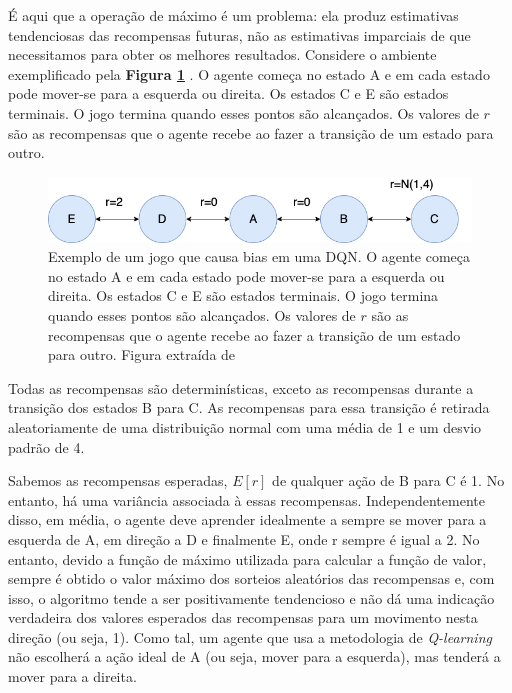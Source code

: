 É aqui que a operação de máximo é um problema: ela produz estimativas tendenciosas das recompensas futuras, não as estimativas imparciais de que necessitamos para obter os melhores resultados.
Considere o ambiente exemplificado pela \textbf{Figura \ref{fig:dqn_bias}} \cite{ThomasAndrew:adv_ml}. O agente começa no estado A e em cada estado pode mover-se para a esquerda ou direita. Os estados C e E são estados terminais. O jogo termina quando esses pontos são alcançados. Os valores de $r$ são as recompensas que o agente recebe ao fazer a transição de um estado para outro.

\begin{figure}[h]
  \centering
  \includegraphics[width=.9 \textwidth]{conteudo/imgs/dqn_bias.png}
  \caption[\textit{Deep Q Network} bias]{Exemplo de um jogo que causa bias em uma DQN. O agente começa no estado A e em cada estado pode mover-se para a esquerda ou direita. Os estados C e E são estados terminais. O jogo termina quando esses pontos são alcançados. Os valores de $r$ são as recompensas que o agente recebe ao fazer a transição de um estado para outro. Figura extraída de \cite{ThomasAndrew:adv_ml}}
  \label{fig:dqn_bias}
\end{figure} 

Todas as recompensas são determinísticas, exceto as recompensas durante a transição dos estados B para C. As recompensas para essa transição é retirada aleatoriamente de uma distribuição normal com uma média de 1 e um desvio padrão de 4.

Sabemos as recompensas esperadas, $E[r]$ de qualquer ação de B para C é 1. No entanto, há uma variância associada à essas recompensas. Independentemente disso, em média, o agente deve aprender idealmente a sempre se mover para a esquerda de A, em direção a D e finalmente E, onde r sempre é igual a 2. No entanto, devido a função de máximo utilizada para calcular a função de valor, sempre é obtido o valor máximo dos sorteios aleatórios das recompensas e, com isso, o algoritmo tende a ser positivamente tendencioso e não dá uma indicação verdadeira dos valores esperados das recompensas para um movimento nesta direção (ou seja, 1). Como tal, um agente que usa a metodologia de \textit{Q-learning} não escolherá a ação ideal de A (ou seja, mover para a esquerda), mas tenderá a mover para a direita.

